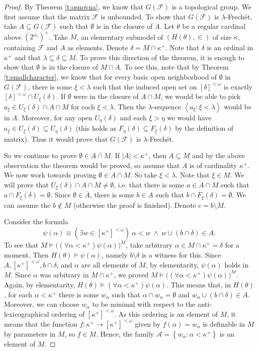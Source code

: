 \documentclass[10pt,a4paper]{amsart}
\newcommand{\abs}[1]{\left\vert#1\right\vert}
\newcommand{\ps}{\emptyset}
\newcommand{\seq}[1]{\left<#1\right>}
\newcommand{\set}[1]{\left\{#1\right\}}
\newcommand{\sst}{\subseteq}
\renewcommand{\a}{\alpha}
\renewcommand{\d}{\delta}
\renewcommand{\k}{\kappa}
\renewcommand{\l}{\lambda}
\renewcommand{\o}{\omega}
\begin{document}
\begin{proof}
	By Theorem \ref{t:osnovna}, we know that $G(\mathcal F)$ is a topological group.
	We first assume that the matrix $\mathcal F$ is unbounded.
	To show that $G(\mathcal F)$ is $\l$-Frech\'et, take $A\sst G(\mathcal F)$ such that $\ps$ is in the closure of $A$.
	Let $\theta$ be a regular cardinal above $\left(2^{\o_1}\right)^+$.
	Take $M$, an elementary submodel of $(H(\theta),\in)$ of size $\k$, containing $\mathcal F$ and $A$ as elements.
	Denote $\d=M\cap \k^+$.
	Note that $\d$ is an ordinal in $\k^+$ and that $\l\sst\d\sst M$.
	To prove this direction of the theorem, it is enough to show that $\ps$ is in the closure of $M\cap A$.
	To see this, note that by Theorem \ref{t:smallcharacter}, we know that for every basic open neighborhood of $\ps$ in $G(\mathcal F)$, there is some $\xi<\l$ such that the induced open set on $[\d]^{<\o}$ is exactly $[\d]^{<\o}\cap U_{\xi}(\d)$.
	If $\ps$ were in the closure of $A\cap M$, we would be able to pick $a_{\xi}\in U_{\xi}(\d)\cap A\cap M$ for each $\xi<\l$.
	Then the $\l$-sequence $\seq{a_{\xi}:\xi<\l}$ would be in $A$.
	Moreover, for any open $U_{\eta}(\d)$ and each $\xi>\eta$ we would have $a_{\xi}\in U_{\xi}(\d)\sst U_{\eta}(\d)$ (this holds as $F_{\eta}(\d)\sst F_{\xi}(\d)$ by the definition of matrix).
	Thus it would prove that $G(\mathcal F)$ is $\l$-Frech\'et.

	So we continue to prove $\ps\in \overline{A\cap M}$.
	If $\abs{A}<\k^+$, then $A\sst M$ and by the above observation the theorem would be proved, so assume that $A$ is of cardinality $\k^+$.
	We now work towards proving $\ps\in\overline{A\cap M}$.
	So take $\xi<\l$.
	Note that $\xi\in M$.
	We will prove that $U_{\xi}(\d)\cap A\cap M\neq\ps$, i.e. that there is some $a\in A\cap M$ such that $a\cap F_{\xi}(\d)=\ps$.
	Since $\ps\in \overline{A}$, there is some $b\in A$ such that $b\cap F_{\xi}(\d)=\ps$.
	We can assume the $b\notin M$ (otherwise the proof is finished).
	Denote $c=b\setminus M$.
	
	Consider the formula $$\psi(\a)\equiv \left(\exists w\in [\k^+]^{<\o}\right)\ \a<w\ \wedge\ w\cup (b\cap \d)\in A.$$
	To see that $M\models \big((\forall \a<\k^+)\psi(\a)\big)^M$, take arbitrary $\a\in M\cap \k^+=\d$ for a moment.
	Then $H(\theta)\models \psi(\a)$, namely $b\setminus \d$ is a witness for this.
	Since $A,[\k^+]^{<\o},b\cap\d$, and $\a$ are all elements of $M$, by elementarity, $\psi(\a)$ holds in $M$.
	Since $\a$ was arbitrary in $M\cap \k^+$, we proved $M\models \big((\forall \a<\k^+)\psi(\a)\big)^M$.
	Again, by elementarity, $H(\theta)\models (\forall \a<\k^+)\psi(\a)$.
	This means that, in $H(\theta)$, for each $\a<\k^+$ there is some $w_{\a}$ such that $\a\cap w_{\a}=\ps$ and $w_{\a}\cup (b\cap\d)\in A$.
	Moreover, we can choose $w_{\a}$ to be minimal with respect to the anti-lexicographical ordering of $[\k^+]^{<\o}$.
	As this ordering is an element of $M$, it means that the function $f:\k^+\to [\k^+]^{<\o}$ given by $f(\a)=w_{\a}$ is definable in $M$ by parameters in $M$, so $f\in M$.
	Hence, the family $\mathcal A=\set{w_{\a}:\a<\k^+}$ is an element of $M$.


\end{proof}
\end{document}

